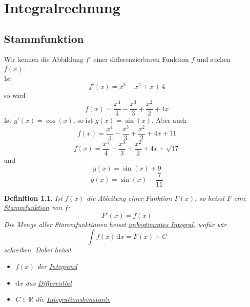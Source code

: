 \documentclass{report}
\newtheorem{mydef}{Definition}
\begin{document}
\chapter{Integralrechnung}
\section{Stammfunktion}
Wir kennen die Abbildung $f'$ einer differenzierbaren Funktion $f$ und suchen $f(x)$.\\
Ist
\begin{equation}f'(x) = x^3 - x^2 + x + 4\end{equation}
so wird
\begin{equation}f(x) = \frac{x^4}{4} - \frac{x^3}{3} + \frac{x^2}{2} + 4x\end{equation}
Ist $g'(x) = \cos(x)$, so ist $g(x) = \sin(x)$. Aber auch
\begin{equation}f(x) = \frac{x^4}{4} - \frac{x^3}{3} + \frac{x^2}{2} + 4x + 11\end{equation}
\begin{equation}f(x) = \frac{x^4}{4} - \frac{x^3}{3} + \frac{x^2}{2} + 4x + \sqrt{17}\end{equation}
und
\begin{equation}g(x) = \sin(x) + 9\end{equation}
\begin{equation}g(x) = \sin(x) - \frac{7}{11}\end{equation}
\begin{mydef}Ist $f(x)$ die Ableitung einer Funktion $F(x)$, so heisst $F$ eine \underline{Stammfunktion} von $f$:
\begin{equation}F'(x) = f(x)\end{equation}
Die Menge aller Stammfunktionen heisst \underline{unbestimmtes Integral}, wofür wir
\begin{equation}\int \! f(x) \, \mathrm{d} x = F(x) + C\end{equation}
schreiben. Dabei heisst
\begin{itemize}
\item $f(x)$ der \underline{Integrand}
\item $\mathrm{d}x$ das \underline{Differential}
\item $C \in \mathbb{R}$ die \underline{Integrationskonstante}
\end{itemize}
\end{mydef}
\end{document}
